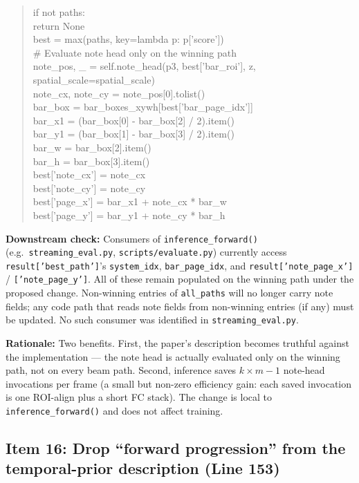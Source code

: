 \documentclass{article}
\begin{document}
\begin{quote}
if not paths:\\
\hspace*{1em}return None\\[4pt]
best = max(paths, key=lambda p: p['score'])\\[4pt]
\# Evaluate note head only on the winning path\\
note\_pos, \_ = self.note\_head(p3, best['bar\_roi'], z,\\
\hspace*{6em}spatial\_scale=spatial\_scale)\\
note\_cx, note\_cy = note\_pos[0].tolist()\\
bar\_box = bar\_boxes\_xywh[best['bar\_page\_idx']]\\
bar\_x1 = (bar\_box[0] - bar\_box[2] / 2).item()\\
bar\_y1 = (bar\_box[1] - bar\_box[3] / 2).item()\\
bar\_w = bar\_box[2].item()\\
bar\_h = bar\_box[3].item()\\
best['note\_cx'] = note\_cx\\
best['note\_cy'] = note\_cy\\
best['page\_x'] = bar\_x1 + note\_cx * bar\_w\\
best['page\_y'] = bar\_y1 + note\_cy * bar\_h
\end{quote}

\textbf{Downstream check:}
Consumers of \texttt{inference\_forward()} (e.g.\ \texttt{streaming\_eval.py}, \texttt{scripts/evaluate.py}) currently access \texttt{result['best\_path']}'s \texttt{system\_idx}, \texttt{bar\_page\_idx}, and \texttt{result['note\_page\_x']} / \texttt{['note\_page\_y']}. All of these remain populated on the winning path under the proposed change. Non-winning entries of \texttt{all\_paths} will no longer carry note fields; any code path that reads note fields from non-winning entries (if any) must be updated. No such consumer was identified in \texttt{streaming\_eval.py}.

\textbf{Rationale:}
Two benefits. First, the paper's description becomes truthful against the implementation --- the note head is actually evaluated only on the winning path, not on every beam path. Second, inference saves $k \times m - 1$ note-head invocations per frame (a small but non-zero efficiency gain: each saved invocation is one ROI-align plus a short FC stack). The change is local to \texttt{inference\_forward()} and does not affect training.

\subsection*{Item 16: Drop ``forward progression'' from the temporal-prior description (Line 153)}
\end{document}
